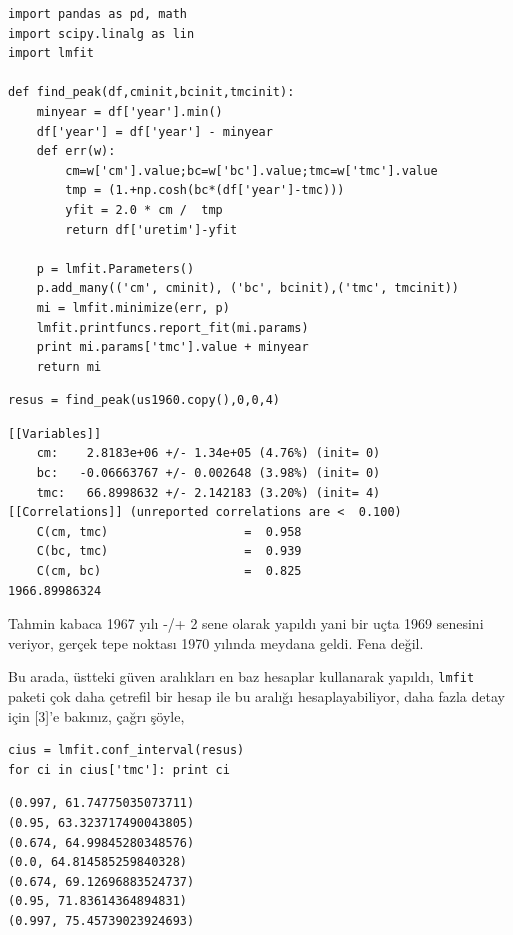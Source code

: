 \documentclass[12pt,fleqn]{article}\usepackage{../../common}
\begin{document}
\begin{verbatim}
import pandas as pd, math
import scipy.linalg as lin
import lmfit

def find_peak(df,cminit,bcinit,tmcinit):
    minyear = df['year'].min()
    df['year'] = df['year'] - minyear
    def err(w):
        cm=w['cm'].value;bc=w['bc'].value;tmc=w['tmc'].value
        tmp = (1.+np.cosh(bc*(df['year']-tmc)))
        yfit = 2.0 * cm /  tmp
        return df['uretim']-yfit

    p = lmfit.Parameters()
    p.add_many(('cm', cminit), ('bc', bcinit),('tmc', tmcinit))
    mi = lmfit.minimize(err, p)
    lmfit.printfuncs.report_fit(mi.params)
    print mi.params['tmc'].value + minyear
    return mi
\end{verbatim}

\begin{verbatim}
resus = find_peak(us1960.copy(),0,0,4)
\end{verbatim}

\begin{verbatim}
[[Variables]]
    cm:    2.8183e+06 +/- 1.34e+05 (4.76%) (init= 0)
    bc:   -0.06663767 +/- 0.002648 (3.98%) (init= 0)
    tmc:   66.8998632 +/- 2.142183 (3.20%) (init= 4)
[[Correlations]] (unreported correlations are <  0.100)
    C(cm, tmc)                   =  0.958 
    C(bc, tmc)                   =  0.939 
    C(cm, bc)                    =  0.825 
1966.89986324
\end{verbatim}

Tahmin kabaca 1967 yılı -/+ 2 sene olarak yapıldı yani bir uçta 1969
senesini veriyor, gerçek tepe noktası 1970 yılında meydana geldi.  Fena
değil.

Bu arada, üstteki güven aralıkları en baz hesaplar kullanarak yapıldı,
\verb!lmfit! paketi çok daha çetrefil bir hesap ile bu aralığı hesaplayabiliyor,
daha fazla detay için [3]'e bakınız, çağrı şöyle,

\begin{verbatim}
cius = lmfit.conf_interval(resus)
for ci in cius['tmc']: print ci
\end{verbatim}

\begin{verbatim}
(0.997, 61.74775035073711)
(0.95, 63.323717490043805)
(0.674, 64.99845280348576)
(0.0, 64.814585259840328)
(0.674, 69.12696883524737)
(0.95, 71.83614364894831)
(0.997, 75.45739023924693)
\end{verbatim}
\end{document}
